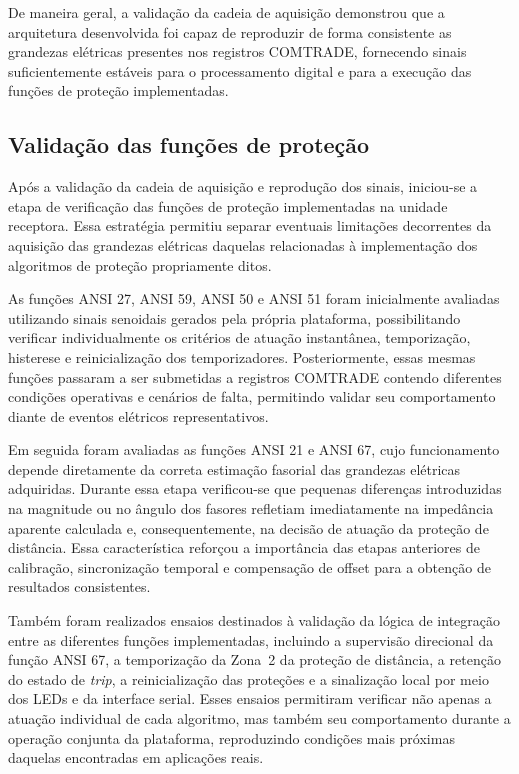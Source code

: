 De maneira geral, a validação da cadeia de aquisição demonstrou que a arquitetura desenvolvida foi capaz de reproduzir de forma consistente as grandezas elétricas presentes nos registros COMTRADE, fornecendo sinais suficientemente estáveis para o processamento digital e para a execução das funções de proteção implementadas.

\subsection{Validação das funções de proteção}

Após a validação da cadeia de aquisição e reprodução dos sinais, iniciou-se a etapa de verificação das funções de proteção implementadas na unidade receptora. Essa estratégia permitiu separar eventuais limitações decorrentes da aquisição das grandezas elétricas daquelas relacionadas à implementação dos algoritmos de proteção propriamente ditos.

As funções ANSI 27, ANSI 59, ANSI 50 e ANSI 51 foram inicialmente avaliadas utilizando sinais senoidais gerados pela própria plataforma, possibilitando verificar individualmente os critérios de atuação instantânea, temporização, histerese e reinicialização dos temporizadores. Posteriormente, essas mesmas funções passaram a ser submetidas a registros COMTRADE contendo diferentes condições operativas e cenários de falta, permitindo validar seu comportamento diante de eventos elétricos representativos.

Em seguida foram avaliadas as funções ANSI 21 e ANSI 67, cujo funcionamento depende diretamente da correta estimação fasorial das grandezas elétricas adquiridas. Durante essa etapa verificou-se que pequenas diferenças introduzidas na magnitude ou no ângulo dos fasores refletiam imediatamente na impedância aparente calculada e, consequentemente, na decisão de atuação da proteção de distância. Essa característica reforçou a importância das etapas anteriores de calibração, sincronização temporal e compensação de offset para a obtenção de resultados consistentes.

Também foram realizados ensaios destinados à validação da lógica de integração entre as diferentes funções implementadas, incluindo a supervisão direcional da função ANSI 67, a temporização da Zona~2 da proteção de distância, a retenção do estado de \textit{trip}, a reinicialização das proteções e a sinalização local por meio dos LEDs e da interface serial. Esses ensaios permitiram verificar não apenas a atuação individual de cada algoritmo, mas também seu comportamento durante a operação conjunta da plataforma, reproduzindo condições mais próximas daquelas encontradas em aplicações reais.

